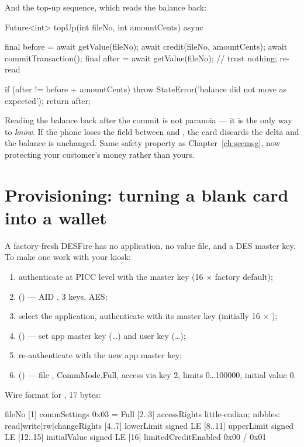 And the top-up sequence, which reads the balance back:

\begin{dcode}
Future<int> topUp(int fileNo, int amountCents) async {
  final before = await getValue(fileNo);
  await credit(fileNo, amountCents);
  await commitTransaction();
  final after = await getValue(fileNo);      // trust nothing; re-read

  if (after != before + amountCents) {
    throw StateError('balance did not move as expected');
  }
  return after;
}
\end{dcode}

Reading the balance back after the commit is not paranoia --- it is the only way
to \emph{know}. If the phone loses the field between  and
, the card discards the delta and the balance is
unchanged. Same safety property as Chapter~\ref{ch:secmsg}, now protecting your
customer's money rather than yours.

\section{Provisioning: turning a blank card into a wallet}

A factory-fresh DESFire has no application, no value file, and a DES master key.
To make one work with your kiosk:

\begin{enumerate}
  \item authenticate at PICC level with the master key (16 $\times$  factory default);
  \item {} () --- AID , 3 keys, AES;
  \item select the application, authenticate with its master key (initially 16 $\times$ );
  \item {} () --- set app master key (\ldots) and user key (\ldots);
  \item re-authenticate with the new app master key;
  \item {} () --- file , CommMode.Full,
        access via key 2, limits 0\ldots100000, initial value 0.
\end{enumerate}

Wire format for , 17 bytes:

\begin{trace}
[0]      fileNo
[1]      commSettings          0x03 = Full
[2..3]   accessRights          little-endian; nibbles: read|write|rw|changeRights
[4..7]   lowerLimit            signed LE
[8..11]  upperLimit            signed LE
[12..15] initialValue          signed LE
[16]     limitedCreditEnabled  0x00 / 0x01
\end{trace}

